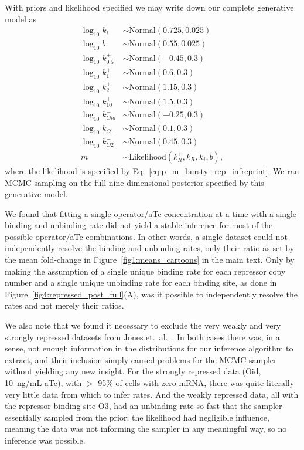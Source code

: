 With priors and likelihood specified we may write down our complete generative model as
\begin{equation}
\begin{split}
\log_{10}k_i &\sim \text{Normal}(0.725, 0.025)\\
\log_{10}b   &\sim \text{Normal}(0.55, 0.025)\\
\log_{10}k_{0.5}^+ &\sim \text{Normal}(-0.45, 0.3)\\
\log_{10}k_{1}^+   &\sim \text{Normal}(0.6, 0.3)\\
\log_{10}k_{2}^+   &\sim \text{Normal}(1.15, 0.3)\\
\log_{10}k_{10}^+  &\sim \text{Normal}(1.5, 0.3)\\
\log_{10}k_{Oid}^- &\sim \text{Normal}(-0.25, 0.3)\\
\log_{10}k_{O1}^-  &\sim \text{Normal}(0.1, 0.3)\\
\log_{10}k_{O2}^-  &\sim \text{Normal}(0.45, 0.3)\\
m &\sim \text{Likelihood}(k_R^+, k_R^-, k_i, b),
\end{split}
\end{equation}
where the likelihood is specified by Eq.~\ref{eq:p_m_bursty+rep_infreprint}.
We ran MCMC sampling on the full nine dimensional posterior specified
by this generative model.

We found that fitting a single operator/aTc concentration at a time with a
single binding and unbinding rate did not yield a stable inference for most of
the possible operator/aTc combinations. In other words, a single dataset could
not independently resolve the binding and unbinding rates, only their ratio as
set by the mean fold-change in Figure~\ref{fig1:means_cartoons} in the main
text. Only by making the assumption of a single unique binding rate for each
repressor copy number and a single unique unbinding rate for each binding site,
as done in Figure~\ref{fig4:repressed_post_full}(A), was it possible to
independently resolve the rates and not merely their ratios.

We also note that we found it necessary to exclude the very weakly and very
strongly repressed datasets from Jones et.\ al.~\cite{Jones2014}. In both cases
there was, in a sense, not enough information in the distributions for our
inference algorithm to extract, and their inclusion simply caused problems for
the MCMC sampler without yielding any new insight. For the strongly repressed
data (Oid, 10~ng/mL aTc), with $>$ 95\% of cells with zero mRNA, there was quite
literally very little data from which to infer rates. And the weakly repressed
data, all with the repressor binding site O3, had an unbinding rate so fast that
the sampler essentially sampled from the prior; the likelihood had negligible
influence, meaning the data was not informing the sampler in any meaningful way,
so no inference was possible.

